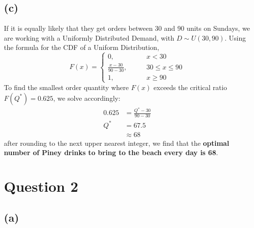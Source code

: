 \documentclass[12pt]{article}
\begin{document}
\subsection*{(c)}   


If it is equally likely that they get orders between 30 and 90 units on Sundays, we are working with a Uniformly Distributed Demand, with $D \sim U(30,90)$. Using the formula for the CDF of a Uniform Distribution, \begin{equation*}
    F(x) = \begin{cases}
        0, \qquad & x < 30 \\ 
        \displaystyle\frac{x - 30}{90-30}, \qquad & 30 \leq x \leq 90 \\ 
        1, \qquad & x \geq 90
    \end{cases}
\end{equation*} To find the smallest order quantity where $F(x)$ exceeds the critical ratio $F(Q^{*}) = 0.625$, we solve accordingly: \begin{align*}
    0.625 &= \frac{Q^{*} - 30}{90-30} \\ 
    Q^{*} &= 67.5 \\ 
    &\approx \boxed{68}
\end{align*} after rounding to the next upper nearest integer, we find that the \textbf{optimal number of Piney drinks to bring to the beach every day is 68}.

\newpage 

\section*{Question 2}



\subsection*{(a)}   
\end{document}
